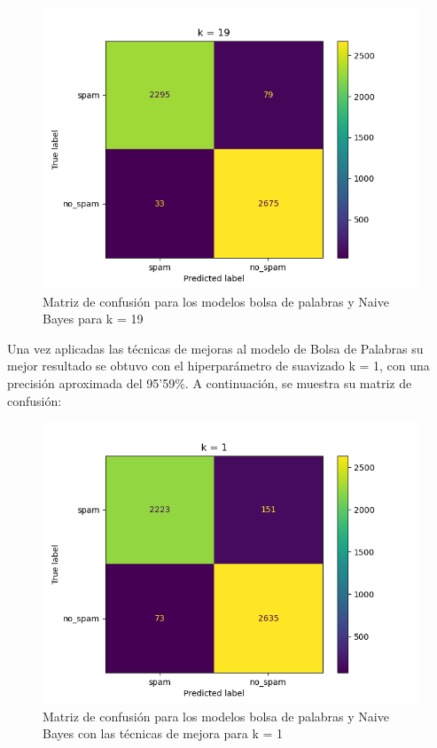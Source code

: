 \documentclass[conference,a4paper]{IEEEtran}
\begin{document}
\begin{figure}[hbtp]
\caption{Matriz de confusión para los modelos bolsa de palabras y Naive Bayes para k = 19}
\centering
\includegraphics[scale=0.50]{bow.png}
\end{figure}

\newpage

Una vez aplicadas las técnicas de mejoras al modelo de Bolsa de Palabras su mejor resultado se obtuvo con el hiperparámetro de suavizado k = 1, con una precisión aproximada del 95’59\%. A continuación, se muestra su matriz de confusión:

\begin{figure}[hbtp]
\caption{Matriz de confusión para los modelos bolsa de palabras y Naive Bayes con las técnicas de mejora para k = 1}
\centering
\includegraphics[scale=0.50]{bowCM.png}
\end{figure}
\end{document}
